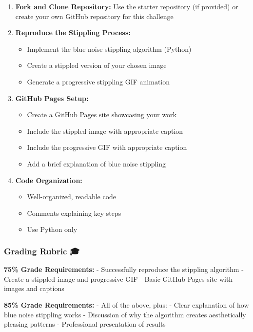 \documentclass[
  letterpaper,
  DIV=11,
  numbers=noendperiod]{scrartcl}
\providecommand{\tightlist}{%
  \setlength{\itemsep}{0pt}\setlength{\parskip}{0pt}}
\begin{document}
\begin{enumerate}
\def\labelenumi{\arabic{enumi}.}
\item
  \textbf{Fork and Clone Repository:} Use the starter repository (if
  provided) or create your own GitHub repository for this challenge
\item
  \textbf{Reproduce the Stippling Process:}

  \begin{itemize}
  \tightlist
  \item
    Implement the blue noise stippling algorithm (Python)
  \item
    Create a stippled version of your chosen image
  \item
    Generate a progressive stippling GIF animation
  \end{itemize}
\item
  \textbf{GitHub Pages Setup:}

  \begin{itemize}
  \tightlist
  \item
    Create a GitHub Pages site showcasing your work
  \item
    Include the stippled image with appropriate caption
  \item
    Include the progressive GIF with appropriate caption
  \item
    Add a brief explanation of blue noise stippling
  \end{itemize}
\item
  \textbf{Code Organization:}

  \begin{itemize}
  \tightlist
  \item
    Well-organized, readable code
  \item
    Comments explaining key steps
  \item
    Use Python only
  \end{itemize}
\end{enumerate}

\subsubsection{Grading Rubric 🎓}\label{grading-rubric}

\textbf{75\% Grade Requirements:} - Successfully reproduce the stippling
algorithm - Create a stippled image and progressive GIF - Basic GitHub
Pages site with images and captions

\textbf{85\% Grade Requirements:} - All of the above, plus: - Clear
explanation of how blue noise stippling works - Discussion of why the
algorithm creates aesthetically pleasing patterns - Professional
presentation of results
\end{document}

